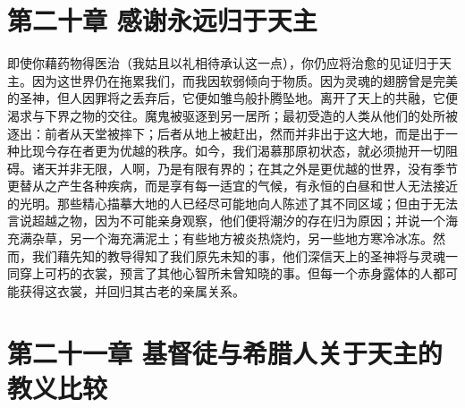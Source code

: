 
\section{第二十章  感谢永远归于天主}

即使你藉药物得医治（我姑且以礼相待承认这一点），你仍应将治愈的见证归于天主。因为这世界仍在拖累我们，而我因软弱倾向于物质。因为灵魂的翅膀曾是完美的圣神，但人因罪将之丢弃后，它便如雏鸟般扑腾坠地。离开了天上的共融，它便渴求与下界之物的交往。魔鬼被驱逐到另一居所；最初受造的人类从他们的处所被逐出：前者从天堂被摔下；后者从地上被赶出，然而并非出于这大地，而是出于一种比现今存在者更为优越的秩序。如今，我们渴慕那原初状态，就必须抛开一切阻碍。诸天并非无限，人啊，乃是有限有界的；在其之外是更优越的世界，没有季节更替从之产生各种疾病，而是享有每一适宜的气候，有永恒的白昼和世人无法接近的光明。那些精心描摹大地的人已经尽可能地向人陈述了其不同区域；但由于无法言说超越之物，因为不可能亲身观察，他们便将潮汐的存在归为原因；并说一个海充满杂草，另一个海充满泥土；有些地方被炎热烧灼，另一些地方寒冷冰冻。然而，我们藉先知的教导得知了我们原先未知的事，他们深信天上的圣神将与灵魂一同穿上可朽的衣裳，预言了其他心智所未曾知晓的事。但每一个赤身露体的人都可能获得这衣裳，并回归其古老的亲属关系。\par


\section{第二十一章 基督徒与希腊人关于天主的教义比较}

